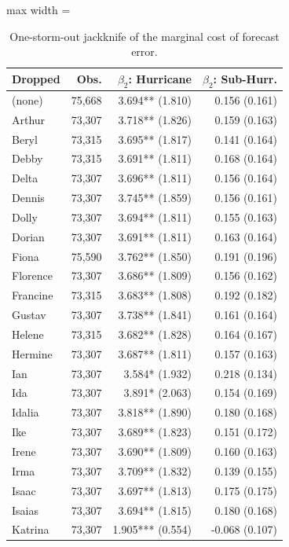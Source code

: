 \begin{table}

\caption{One-storm-out jackknife of the marginal cost of forecast error. \label{tab:cost_jackknife}}
\centering
\begin{adjustbox}{max width = \textwidth}
\begin{threeparttable}
\begin{tabular}[t]{>{\raggedright\arraybackslash}p{3cm}rrr}
\toprule
Dropped & Obs. & $\beta_2$: Hurricane & $\beta_2$: Sub-Hurr.\\
\midrule
(none) & 75,668 & 3.694** (1.810) & 0.156 (0.161)\\
Arthur & 73,307 & 3.718** (1.826) & 0.159 (0.163)\\
Beryl & 73,315 & 3.695** (1.817) & 0.141 (0.164)\\
Debby & 73,315 & 3.691** (1.811) & 0.168 (0.164)\\
Delta & 73,307 & 3.696** (1.811) & 0.156 (0.164)\\
Dennis & 73,307 & 3.745** (1.859) & 0.156 (0.161)\\
Dolly & 73,307 & 3.694** (1.811) & 0.155 (0.163)\\
Dorian & 73,307 & 3.691** (1.811) & 0.163 (0.164)\\
Fiona & 75,590 & 3.762** (1.850) & 0.191 (0.196)\\
Florence & 73,307 & 3.686** (1.809) & 0.156 (0.162)\\
Francine & 73,315 & 3.683** (1.808) & 0.192 (0.182)\\
Gustav & 73,307 & 3.738** (1.841) & 0.161 (0.164)\\
Helene & 73,315 & 3.682** (1.828) & 0.164 (0.167)\\
Hermine & 73,307 & 3.687** (1.811) & 0.157 (0.163)\\
Ian & 73,307 & 3.584* (1.932) & 0.218 (0.134)\\
Ida & 73,307 & 3.891* (2.063) & 0.154 (0.169)\\
Idalia & 73,307 & 3.818** (1.890) & 0.180 (0.168)\\
Ike & 73,307 & 3.689** (1.823) & 0.151 (0.172)\\
Irene & 73,307 & 3.690** (1.809) & 0.160 (0.163)\\
Irma & 73,307 & 3.709** (1.832) & 0.139 (0.155)\\
Isaac & 73,307 & 3.697** (1.813) & 0.175 (0.175)\\
Isaias & 73,307 & 3.694** (1.815) & 0.180 (0.168)\\
Katrina & 73,307 & 1.905*** (0.554) & -0.068 (0.107)\\

\end{tabular}
\end{threeparttable}
\end{adjustbox}
\end{table}
